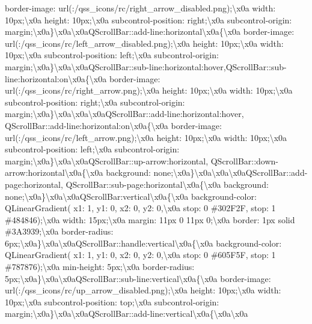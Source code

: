 border-\/image\+: url(\+:/qss\+\_\+icons/rc/right\+\_\+arrow\+\_\+disabled.\+png);\textbackslash{}x0a width\+: 10px;\textbackslash{}x0a height\+: 10px;\textbackslash{}x0a subcontrol-\/position\+: right;\textbackslash{}x0a subcontrol-\/origin\+: margin;\textbackslash{}x0a\}\textbackslash{}x0a\textbackslash{}x0a\+Q\+Scroll\+Bar\+::add-\/line\+:horizontal\textbackslash{}x0a\{\textbackslash{}x0a border-\/image\+: url(\+:/qss\+\_\+icons/rc/left\+\_\+arrow\+\_\+disabled.\+png);\textbackslash{}x0a height\+: 10px;\textbackslash{}x0a width\+: 10px;\textbackslash{}x0a subcontrol-\/position\+: left;\textbackslash{}x0a subcontrol-\/origin\+: margin;\textbackslash{}x0a\}\textbackslash{}x0a\textbackslash{}x0a\+Q\+Scroll\+Bar\+::sub-\/line\+:horizontal\+:hover,\+Q\+Scroll\+Bar\+::sub-\/line\+:horizontal\+:on\textbackslash{}x0a\{\textbackslash{}x0a border-\/image\+: url(\+:/qss\+\_\+icons/rc/right\+\_\+arrow.\+png);\textbackslash{}x0a height\+: 10px;\textbackslash{}x0a width\+: 10px;\textbackslash{}x0a subcontrol-\/position\+: right;\textbackslash{}x0a subcontrol-\/origin\+: margin;\textbackslash{}x0a\}\textbackslash{}x0a\textbackslash{}x0a\textbackslash{}x0a\+Q\+Scroll\+Bar\+::add-\/line\+:horizontal\+:hover, Q\+Scroll\+Bar\+::add-\/line\+:horizontal\+:on\textbackslash{}x0a\{\textbackslash{}x0a border-\/image\+: url(\+:/qss\+\_\+icons/rc/left\+\_\+arrow.\+png);\textbackslash{}x0a height\+: 10px;\textbackslash{}x0a width\+: 10px;\textbackslash{}x0a subcontrol-\/position\+: left;\textbackslash{}x0a subcontrol-\/origin\+: margin;\textbackslash{}x0a\}\textbackslash{}x0a\textbackslash{}x0a\+Q\+Scroll\+Bar\+::up-\/arrow\+:horizontal, Q\+Scroll\+Bar\+::down-\/arrow\+:horizontal\textbackslash{}x0a\{\textbackslash{}x0a background\+: none;\textbackslash{}x0a\}\textbackslash{}x0a\textbackslash{}x0a\textbackslash{}x0a\+Q\+Scroll\+Bar\+::add-\/page\+:horizontal, Q\+Scroll\+Bar\+::sub-\/page\+:horizontal\textbackslash{}x0a\{\textbackslash{}x0a background\+: none;\textbackslash{}x0a\}\textbackslash{}x0a\textbackslash{}x0a\+Q\+Scroll\+Bar\+:vertical\textbackslash{}x0a\{\textbackslash{}x0a background-\/color\+: Q\+Linear\+Gradient( x1\+: 1, y1\+: 0, x2\+: 0, y2\+: 0,\textbackslash{}x0a stop\+: 0 \#302\+F2\+F, stop\+: 1 \#484846);\textbackslash{}x0a width\+: 15px;\textbackslash{}x0a margin\+: 11px 0 11px 0;\textbackslash{}x0a border\+: 1px solid \#3\+A3939;\textbackslash{}x0a border-\/radius\+: 6px;\textbackslash{}x0a\}\textbackslash{}x0a\textbackslash{}x0a\+Q\+Scroll\+Bar\+::handle\+:vertical\textbackslash{}x0a\{\textbackslash{}x0a background-\/color\+: Q\+Linear\+Gradient( x1\+: 1, y1\+: 0, x2\+: 0, y2\+: 0,\textbackslash{}x0a stop\+: 0 \#605\+F5\+F, stop\+: 1 \#787876);\textbackslash{}x0a min-\/height\+: 5px;\textbackslash{}x0a border-\/radius\+: 5px;\textbackslash{}x0a\}\textbackslash{}x0a\textbackslash{}x0a\+Q\+Scroll\+Bar\+::sub-\/line\+:vertical\textbackslash{}x0a\{\textbackslash{}x0a border-\/image\+: url(\+:/qss\+\_\+icons/rc/up\+\_\+arrow\+\_\+disabled.\+png);\textbackslash{}x0a height\+: 10px;\textbackslash{}x0a width\+: 10px;\textbackslash{}x0a subcontrol-\/position\+: top;\textbackslash{}x0a subcontrol-\/origin\+: margin;\textbackslash{}x0a\}\textbackslash{}x0a\textbackslash{}x0a\+Q\+Scroll\+Bar\+::add-\/line\+:vertical\textbackslash{}x0a\{\textbackslash{}x0a\textbackslash{}x0a 